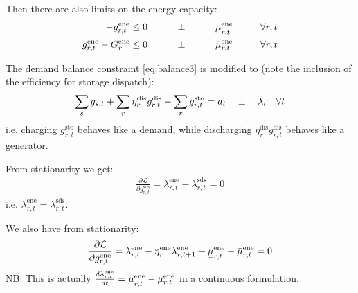 \documentclass[final,3p]{elsarticle}
\def\l{\lambda} \def\K{\kappa} \def\m{\mu} \def\G{\Gamma} \def\d{\partial}
\def\cL{\mathcal{L}} \newcommand{\ubar}[1]{\text{\b{$#1$}}}
\begin{document}
Then there are also limits on the energy capacity:
\begin{align}
  -g^{\textrm{ene}}_{r,t}\leq 0 \hspace{1cm}\perp \hspace{1cm} \ubar{\mu}^{\textrm{ene}}_{r,t} \hspace{1cm} \forall r,t  \label{eq:storlower3} \\
  g^{\textrm{ene}}_{r,t} - G^{\textrm{ene}}_r \leq 0 \hspace{1cm}\perp \hspace{1cm} \bar{\mu}^{\textrm{ene}}_{r,t} \hspace{1cm} \forall r,t \label{eq:storupper3}
\end{align}


The demand balance constraint \eqref{eq:balance3} is modified to (note the
inclusion of the efficiency for storage dispatch):
\begin{align}
  \sum_s g_{s,t} + \sum_r \eta^{\textrm{dis}}_r g^{\textrm{dis}}_{r,t} - \sum_r g^{\textrm{sto}}_{r,t}  =  d_t \hspace{0.34cm}\perp \hspace{0.34cm} \l_t \hspace{0.34cm} \forall t \label{eq:balance4}
\end{align}
i.e. charging $g^{\textrm{sto}}_{r,t}$ behaves like a demand, while discharging
$\eta^{\textrm{dis}}_rg^{\textrm{dis}}_{r,t}$ behaves like a generator.

From stationarity we get:
\begin{align}
  \frac{\d \cL}{\d g^{\textrm{sds}}_{r,t}} = \lambda^{\textrm{ene}}_{r,t} - \lambda^{\textrm{sds}}_{r,t} = 0
\end{align}
i.e. $\lambda^{\textrm{ene}}_{r,t} = \lambda^{\textrm{sds}}_{r,t}$.

We also have from stationarity:
\begin{align}
  \frac{\d \cL}{\d g^{\textrm{ene}}_{r,t}} = \lambda^{\textrm{ene}}_{r,t} - \eta^{\textrm{ene}}_r\lambda^{\textrm{ene}}_{r,t+1} + \ubar{\mu}^{\textrm{ene}}_{r,t} -  \bar{\mu}^{\textrm{ene}}_{r,t} = 0
\end{align}
NB: This is actually $\frac{d \lambda^{\textrm{ene}}_{r,t}}{dt} =
\ubar{\mu}^{\textrm{ene}}_{r,t} - \bar{\mu}^{\textrm{ene}}_{r,t}$ in a
continuous formulation.
\end{document}
